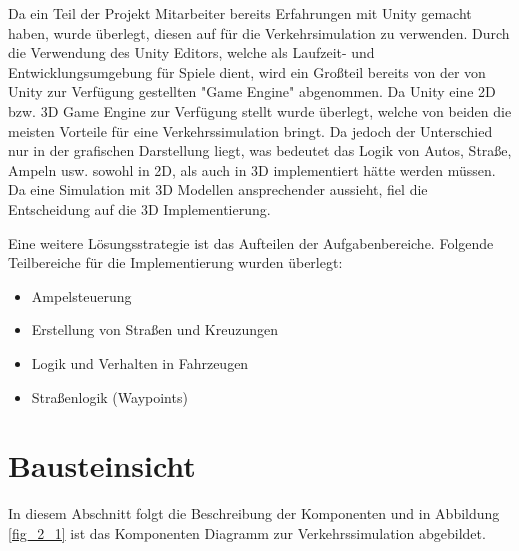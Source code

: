 Da ein Teil der Projekt Mitarbeiter bereits Erfahrungen mit Unity gemacht haben, wurde überlegt, diesen auf für die Verkehrsimulation zu verwenden. Durch die Verwendung des Unity Editors, welche als Laufzeit- und Entwicklungsumgebung für Spiele dient, wird ein Großteil bereits von der von Unity zur Verfügung gestellten "Game Engine" abgenommen. 
Da Unity eine 2D bzw. 3D Game Engine zur Verfügung stellt wurde überlegt, welche von beiden die meisten Vorteile für eine Verkehrssimulation bringt. Da jedoch der Unterschied nur in der grafischen Darstellung liegt, was bedeutet das Logik von Autos, Straße, Ampeln usw. sowohl in 2D, als auch in 3D implementiert hätte werden müssen. Da eine Simulation mit 3D Modellen ansprechender aussieht, fiel die Entscheidung auf die 3D Implementierung.

Eine weitere Lösungsstrategie ist das Aufteilen der Aufgabenbereiche. Folgende Teilbereiche für die Implementierung wurden überlegt:

\begin{itemize}  
\item Ampelsteuerung
\item Erstellung von Straßen und Kreuzungen
\item Logik und Verhalten in Fahrzeugen
\item Straßenlogik (Waypoints)
\end{itemize}

\section{Bausteinsicht}
\label{Bausteinsicht}

In diesem Abschnitt folgt die Beschreibung der Komponenten und in Abbildung \ref{fig_2_1} ist das Komponenten Diagramm zur Verkehrssimulation abgebildet.

